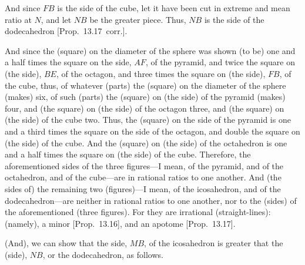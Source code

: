 And since $FB$ is the side of the cube, let it have been cut in extreme and
mean ratio at $N$, and let $NB$ be the greater piece. Thus, $NB$
is the side of the dodecahedron [Prop.~13.17~corr.].

And since the (square) on the diameter of the sphere was shown (to be)
one and a half times the square on the side, $AF$,  of the pyramid,
and twice the square on (the side), $BE$,  of the octagon, and
three times the square on (the side), $FB$, of the cube, 
thus, of whatever (parts) the (square) on the diameter of the
sphere (makes) six, of such (parts) the (square) on (the side) of the pyramid (makes)
four, and (the square) on (the side) of the octagon three, and (the
square) on (the side) of the cube  two. Thus, the (square) on the
side of the pyramid is one and a third times the square on the side of the
octagon, and double the square on (the side) of the cube. 
And the (square) on (the side) of the octahedron is one and a half
times the square on (the side) of the cube. Therefore, the aforementioned
sides of the three figures---I mean, of the pyramid, and of the octahedron, and 
of the cube---are
in rational ratios to one another. And (the sides of) the remaining two (figures)---I mean, of
the icosahedron, and of the dodecahedron---are neither in rational ratios to
one another, nor to the (sides) of the aforementioned (three figures). For they are
irrational (straight-lines): (namely), a minor [Prop.~13.16], and 
an apotome [Prop.~13.17].

(And), we can show that the side, $MB$, of the icosahedron is greater
that the (side), $NB$, or the dodecahedron, as follows.

